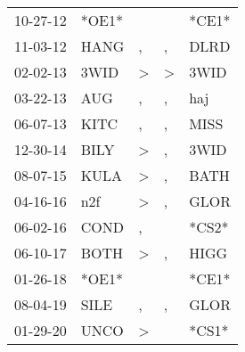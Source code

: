 \begin{supertabular}{lllll}
 10-27-12 &  *OE1* &               &               &  *CE1* \\
 11-03-12 &   HANG &             , &             , &   DLRD \\
 02-02-13 &   3WID &  \textgreater &  \textgreater &   3WID \\
 03-22-13 &    AUG &             , &             , &    haj \\
 06-07-13 &   KITC &             , &             , &   MISS \\
 12-30-14 &   BILY &  \textgreater &             , &   3WID \\
 08-07-15 &   KULA &  \textgreater &             , &   BATH \\
 04-16-16 &    n2f &  \textgreater &             , &   GLOR \\
 06-02-16 &   COND &             , &               &  *CS2* \\
 06-10-17 &   BOTH &  \textgreater &             , &   HIGG \\
 01-26-18 &  *OE1* &               &               &  *CE1* \\
 08-04-19 &   SILE &             , &             , &   GLOR \\
 01-29-20 &   UNCO &  \textgreater &               &  *CS1* \\
\end{supertabular}
